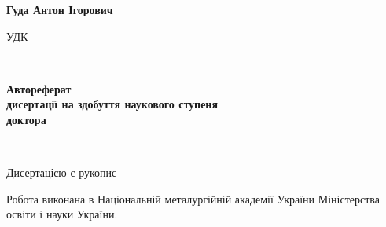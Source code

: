 \documentclass[a4paper,12pt]{atuaref}
\begin{document}
\sloppy

\thispagestyle{empty}
\begin{center}

\textbf{\belongAref}

\vspace{1ex}

\textbf{\institutionAref}

\vspace{3ex}

\textbf{Гуда Антон Ігорович}

\end{center}

\vspace{3ex}

\begin{flushright}
УДК \UDC
\end{flushright}

\vfill

\begin{center}
\textbf{\Large
\booknameUa
}

\vfill

\dissSpecId --- \dissSpecAref

\vfill

\textbf{Автореферат} \\
\textbf{  дисертації на здобуття наукового ступеня }\\
\textbf{доктора \dissScopeAref }


\vfill

\cityAref --- \bookyear

\end{center}

\clearpage

\thispagestyle{empty}
Дисертацією є рукопис

\vspace{3ex plus 2ex}

Робота виконана в Національній металургійній академії України
Міністерства освіти і науки України.


\vspace{3ex plus 2ex}
\end{document}
